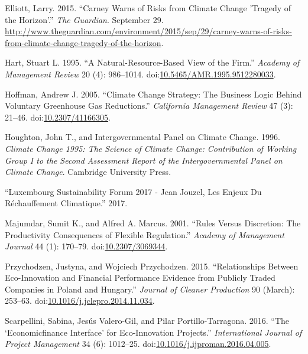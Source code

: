 \documentclass[12pt,]{article}
\begin{document}
\hypertarget{ref-Elliott2015}{}
Elliott, Larry. 2015. ``Carney Warns of Risks from Climate Change
'Tragedy of the Horizon'.'' \emph{The Guardian}. September 29.
\url{http://www.theguardian.com/environment/2015/sep/29/carney-warns-of-risks-from-climate-change-tragedy-of-the-horizon}.

\hypertarget{ref-HartNaturalResourceBasedViewFirm1995}{}
Hart, Stuart L. 1995. ``A Natural-Resource-Based View of the Firm.''
\emph{Academy of Management Review} 20 (4): 986--1014.
doi:\href{https://doi.org/10.5465/AMR.1995.9512280033}{10.5465/AMR.1995.9512280033}.

\hypertarget{ref-HoffmanClimateChangeStrategy2005}{}
Hoffman, Andrew J. 2005. ``Climate Change Strategy: The Business Logic
Behind Voluntary Greenhouse Gas Reductions.'' \emph{California
Management Review} 47 (3): 21--46.
doi:\href{https://doi.org/10.2307/41166305}{10.2307/41166305}.

\hypertarget{ref-HoughtonClimateChange19951996}{}
Houghton, John T., and Intergovernmental Panel on Climate Change. 1996.
\emph{Climate Change 1995: The Science of Climate Change: Contribution
of Working Group I to the Second Assessment Report of the
Intergovernmental Panel on Climate Change}. Cambridge University Press.

\hypertarget{ref-JeanJouzel2017}{}
``Luxembourg Sustainability Forum 2017 - Jean Jouzel, Les Enjeux Du
Réchauffement Climatique.'' 2017.

\hypertarget{ref-MajumdarRulesDiscretionProductivity2001}{}
Majumdar, Sumit K., and Alfred A. Marcus. 2001. ``Rules Versus
Discretion: The Productivity Consequences of Flexible Regulation.''
\emph{Academy of Management Journal} 44 (1): 170--79.
doi:\href{https://doi.org/10.2307/3069344}{10.2307/3069344}.

\hypertarget{ref-PrzychodzenRelationshipsecoinnovationfinancial2015}{}
Przychodzen, Justyna, and Wojciech Przychodzen. 2015. ``Relationships
Between Eco-Innovation and Financial Performance Evidence from Publicly
Traded Companies in Poland and Hungary.'' \emph{Journal of Cleaner
Production} 90 (March): 253--63.
doi:\href{https://doi.org/10.1016/j.jclepro.2014.11.034}{10.1016/j.jclepro.2014.11.034}.

\hypertarget{ref-Scarpellinieconomicfinanceinterface2016}{}
Scarpellini, Sabina, Jesús Valero-Gil, and Pilar Portillo-Tarragona.
2016. ``The `Economicfinance Interface' for Eco-Innovation Projects.''
\emph{International Journal of Project Management} 34 (6): 1012--25.
doi:\href{https://doi.org/10.1016/j.ijproman.2016.04.005}{10.1016/j.ijproman.2016.04.005}.
\end{document}
